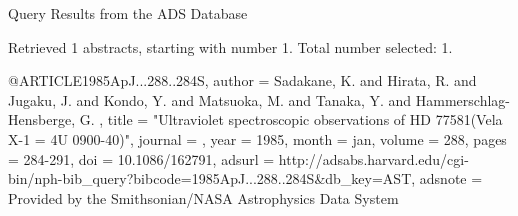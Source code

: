 Query Results from the ADS Database


Retrieved 1 abstracts, starting with number 1.  Total number selected: 1.

@ARTICLE{1985ApJ...288..284S,
   author = {{Sadakane}, K. and {Hirata}, R. and {Jugaku}, J. and {Kondo}, Y. and 
	{Matsuoka}, M. and {Tanaka}, Y. and {Hammerschlag-Hensberge}, G.
	},
    title = "{Ultraviolet spectroscopic observations of HD 77581(Vela X-1 = 4U 0900-40)}",
  journal = {\apj},
     year = 1985,
    month = jan,
   volume = 288,
    pages = {284-291},
      doi = {10.1086/162791},
   adsurl = {http://adsabs.harvard.edu/cgi-bin/nph-bib_query?bibcode=1985ApJ...288..284S&db_key=AST},
  adsnote = {Provided by the Smithsonian/NASA Astrophysics Data System}
}


